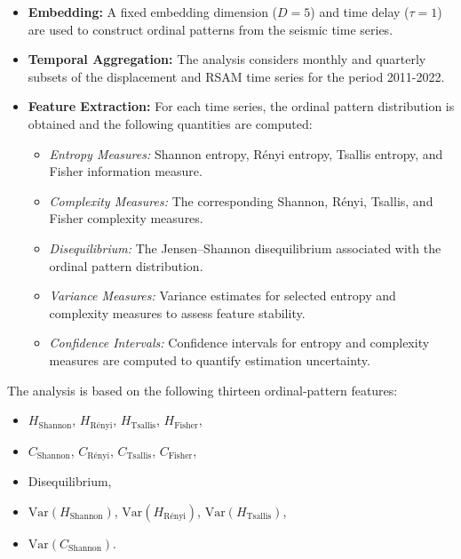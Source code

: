 \documentclass[12pt,a4paper]{article}
\begin{document}
\begin{itemize}
	
	\item \textbf{Embedding:}
	A fixed embedding dimension ($D=5$) and time delay ($\tau=1$) are used to construct ordinal patterns from the seismic time series.
	
	\item \textbf{Temporal Aggregation:}
	The analysis considers monthly and quarterly subsets of the displacement and RSAM time series for the period 2011-2022.
	
	\item \textbf{Feature Extraction:}
	For each time series, the ordinal pattern distribution is obtained and the following quantities are computed:
	
	\begin{itemize}
		
		\item \emph{Entropy Measures:}
		Shannon entropy, R\'enyi entropy, Tsallis entropy, and Fisher information measure.
		
		\item \emph{Complexity Measures:}
		The corresponding Shannon, R\'enyi, Tsallis, and Fisher complexity measures.
		
		\item \emph{Disequilibrium:}
		The Jensen--Shannon disequilibrium associated with the ordinal pattern distribution.
		
		\item \emph{Variance Measures:}
		Variance estimates for selected entropy and complexity measures to assess feature stability.
		
		\item \emph{Confidence Intervals:}
		Confidence intervals for entropy and complexity measures are computed to quantify estimation uncertainty.
		
	\end{itemize}
	
\end{itemize}

The analysis is based on the following thirteen ordinal-pattern features:

\begin{itemize}
	\item $H_{\text{Shannon}}$,
	$H_{\text{Rényi}}$,
	$H_{\text{Tsallis}}$,
	$H_{\text{Fisher}}$,
	
	\item $C_{\text{Shannon}}$,
	$C_{\text{Rényi}}$,
	$C_{\text{Tsallis}}$,
	$C_{\text{Fisher}}$,
	
	\item Disequilibrium,
	
	\item $\mathrm{Var}(H_{\text{Shannon}})$,
	$\mathrm{Var}(H_{\text{Rényi}})$,
	$\mathrm{Var}(H_{\text{Tsallis}})$,
	
	\item $\mathrm{Var}(C_{\text{Shannon}})$.
\end{itemize}
\end{document}
